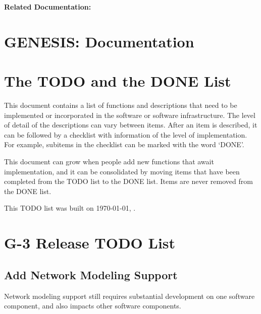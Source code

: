 \documentclass[12pt]{article}
\begin{document}
{\bf Related Documentation:}

\section*{GENESIS: Documentation}

\section{The TODO and the DONE List}

This document contains a list of functions and descriptions that need
to be implemented or incorporated in the software or software
infrastructure.  The level of detail of the descriptions can vary
between items.  After an item is described, it can be followed by a
checklist with information of the level of implementation.  For
example, subitems in the checklist can be marked with the word `DONE'.

This document can grow when people add new functions that await
implementation, and it can be consolidated by moving items that have
been completed from the TODO list to the DONE list.  Items are never
removed from the DONE list.

This TODO list was built on \today, \thistime.


\section{G-3 Release TODO List}

\subsection{Add Network Modeling Support}

Network modeling support still requires substantial development on one
software component, and also impacts other software components.
\end{document}
